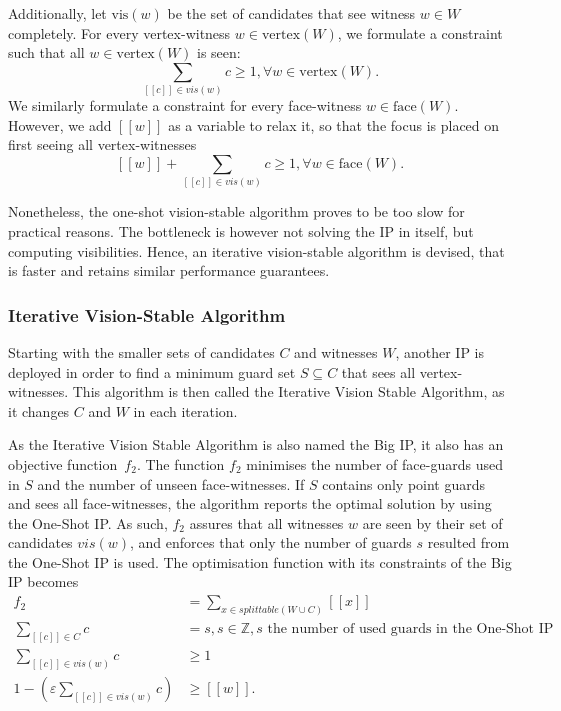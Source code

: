 Additionally, let $\text{vis}(w)$ be the set of candidates that see witness $w \in W$ completely. For every vertex-witness $w \in \text{vertex}(W)$, we formulate a constraint such that all $w \in \text{vertex}(W)$ is seen: $$\sum_{[[c]] \in vis(w)} c \geq 1, \forall w \in \text{vertex}(W).$$ We similarly formulate a constraint for every face-witness $w \in \text{face}(W)$. However, we add $[[w]]$ as a variable to relax it, so that the focus is placed on first seeing all vertex-witnesses $$[[w]] + \sum_{[[c]] \in vis(w)} c \geq 1, \forall w \in \text{face}(W).$$


Nonetheless, the one-shot vision-stable algorithm proves to be too slow for practical reasons. The bottleneck is however not solving the IP in itself, but computing visibilities. Hence, an iterative vision-stable algorithm is devised, that is faster and retains similar performance guarantees. 

\subsubsection{Iterative Vision-Stable Algorithm}
Starting with the smaller sets of candidates $C$ and witnesses $W$, another IP is deployed in order to find a minimum guard set $S \subseteq C$ that sees all vertex-witnesses. This algorithm is then called the Iterative Vision Stable Algorithm, as it changes $C$ and $W$ in each iteration.

As the Iterative Vision Stable Algorithm is also named the Big IP, it also has an objective function~$f_2$. The function $f_2$ minimises the number of face-guards used in $S$ and the number of unseen face-witnesses. If $S$ contains only point guards and sees all face-witnesses, the algorithm reports the optimal solution by using the One-Shot IP. As such, $f_2$ assures that all witnesses $w$ are seen by their set of candidates $vis(w)$, and enforces that only the number of guards $s$ resulted from the One-Shot IP is used. The optimisation function with its constraints of the Big IP becomes
\begin{align}
	f_2 &= \sum_{x \in splittable(W \cup C)} [[x]] \label{eq:f2}\\
	\sum_{[[c]] \in C} c &= s, s \in \mathbb Z, s \text{ the number of used guards in the One-Shot IP} \\
	\sum_{[[c]] \in vis(w)} c &\geq 1 \\
	1 - (\varepsilon \sum_{[[c]] \in vis(w)} c) &\geq [[w]].
\end{align}

